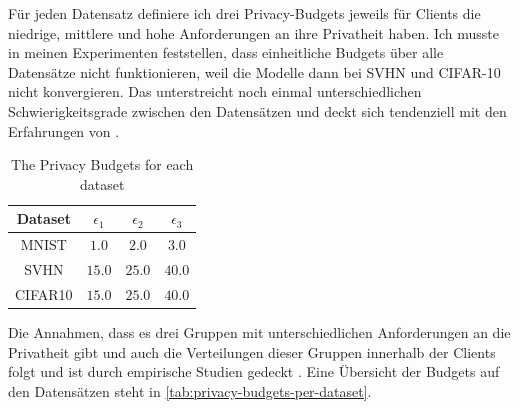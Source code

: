 Für jeden Datensatz definiere ich drei Privacy-Budgets jeweils für Clients die niedrige, mittlere und hohe Anforderungen an ihre Privatheit haben. Ich musste in meinen Experimenten feststellen, dass einheitliche Budgets über alle Datensätze nicht funktionieren, weil die Modelle dann bei SVHN und CIFAR-10 nicht konvergieren. Das unterstreicht noch einmal unterschiedlichen Schwierigkeitsgrade zwischen den Datensätzen und deckt sich tendenziell mit den Erfahrungen von \textcite{sun:2021}.

\begin{table}[tb]
	\centering
	\begin{tabular}{|c|c|c|c|}
		\hline
		Dataset & $\epsilon_1$ & $\epsilon_2$ & $\epsilon_3$ \\
		\hline
		MNIST & $1.0$ & $2.0$ & $3.0$ \\
		SVHN & $15.0$ & $25.0$ & $40.0$ \\
		CIFAR10 & $15.0$ & $25.0$ & $40.0$ \\
		\hline
	\end{tabular}
	\caption{The Privacy Budgets for each dataset}
	\label{tab:privacy-budgets-per-dataset}
\end{table}

Die Annahmen, dass es drei Gruppen mit unterschiedlichen Anforderungen an die Privatheit gibt und auch die Verteilungen dieser Gruppen innerhalb der Clients folgt \textcite{boenisch:2023} und ist durch empirische Studien gedeckt \cite{jensen:2005, acquisti:2005}. Eine Übersicht der Budgets auf den Datensätzen steht in \autoref{tab:privacy-budgets-per-dataset}.



